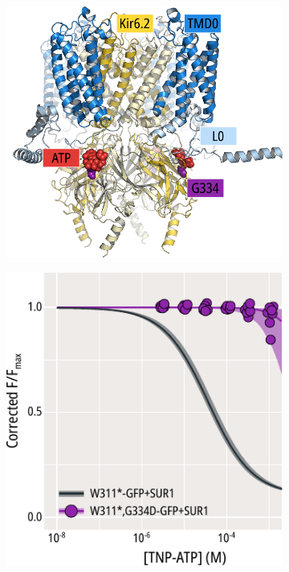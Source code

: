 \begin{figure}[hbtp]
	\centering
	\begin{subfigure}[t]{0.45\textwidth}
		\caption{}\label{ch5fig:g334d_loc}
		\centering
		\includegraphics[width=\textwidth]{g334d_1.pdf}
	\end{subfigure}
	\hfill
	\begin{subfigure}[t]{0.45\textwidth}
		\caption{}\label{ch5fig:g334d_popfits}
		\centering
		\includegraphics[width=\textwidth]{g334d_2.pdf}

\end{subfigure}
\end{figure}

